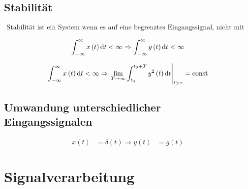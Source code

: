 \subsection{Stabilität}


\begin{boxshaded}
\begin{align*}
\text{Stabilität ist ein System wenn es auf eine begrenztes Eingangssignal, nicht mit einen unendlichen Ausgangssignal reagiert.}
\end{align*}
\end{boxshaded}

\begin{boxleft}
\end{boxleft}\begin{boxrightshaded}
\begin{align*}
\int_{-\infty}^{\infty}x\left(t\right)\mathop{}\!\mathrm{d} t<\infty\Rightarrow\int_{-\infty}^{\infty}y\left(t\right)\mathop{}\!\mathrm{d} t<\infty
\end{align*}
\end{boxrightshaded}


\begin{boxleft}
\end{boxleft}\begin{boxrightshaded}
\begin{align*}
\int_{-\infty}^{\infty}x\left(t\right)\mathop{}\!\mathrm{d} t<\infty\Rightarrow\left.\lim_{T\to \infty}\int_{t_0}^{t_0+T} y^2\left(t\right)\mathop{}\!\mathrm{d} t\right|_{t>\tau}=\text{const}
\end{align*}
\end{boxrightshaded}

\subsection{Umwandung unterschiedlicher Eingangssignalen}


\begin{boxleft}
\end{boxleft}\begin{boxrightshaded}
\begin{align*}
x\left(t\right)&=\delta\left(t\right)\Rightarrow y\left(t\right)&=g\left(t\right)
\end{align*}
\end{boxrightshaded}

\section{Signalverarbeitung}

